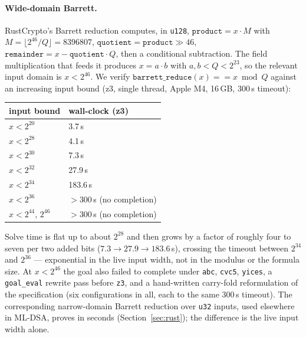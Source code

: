 \documentclass[11pt]{article}
\newcommand{\code}[1]{\texttt{#1}}
\begin{document}
\paragraph{Wide-domain Barrett.} RustCrypto's Barrett reduction computes, in \code{u128},
$\code{product} = x \cdot M$ with $M = \lfloor 2^{46}/Q \rfloor = 8396807$, $\code{quotient} =
\code{product} \gg 46$, $\code{remainder} = x - \code{quotient} \cdot Q$, then a conditional subtraction.
The field multiplication that feeds it produces $x = a \cdot b$ with $a, b < Q < 2^{23}$, so the relevant
input domain is $x < 2^{46}$. We verify $\code{barrett\_reduce}(x) == x \bmod Q$ against an increasing
input bound (z3, single thread, Apple M4, 16\,GB, 300\,s timeout):
\begin{center}
\begin{tabular}{ll}
\hline
input bound & wall-clock (z3) \\
\hline
$x < 2^{20}$ & 3.7\,s \\
$x < 2^{28}$ & 4.1\,s \\
$x < 2^{30}$ & 7.3\,s \\
$x < 2^{32}$ & 27.9\,s \\
$x < 2^{34}$ & 183.6\,s \\
$x < 2^{36}$ & $>300$\,s (no completion) \\
$x < 2^{44},\, 2^{46}$ & $>300$\,s (no completion) \\
\hline
\end{tabular}
\end{center}
Solve time is flat up to about $2^{28}$ and then grows by a factor of roughly four to seven per two
added bits ($7.3 \to 27.9 \to 183.6$\,s), crossing the timeout between $2^{34}$ and $2^{36}$ ---
exponential in the live input width, not in the modulus or the formula size. At $x < 2^{46}$ the goal also failed to
complete under \code{abc}, \code{cvc5}, \code{yices}, a \code{goal\_eval} rewrite pass before \code{z3},
and a hand-written carry-fold reformulation of the specification (six configurations in all, each to the
same 300\,s timeout). The corresponding narrow-domain Barrett reduction over \code{u32} inputs, used
elsewhere in ML-DSA, proves in seconds (Section~\ref{sec:rust}); the difference is the live input width
alone.
\end{document}
